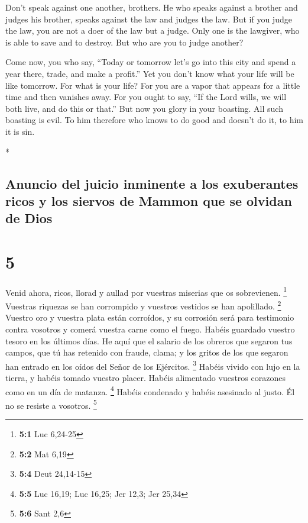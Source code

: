 \begin{paracol}{2}
\begin{otherlanguage}{english}
 Don't speak against one another, brothers. He who speaks
against a brother and judges his brother, speaks against the law and
judges the law. But if you judge the law, you are not a doer of the law
but a judge.  Only one is the lawgiver, who is able to
save and to destroy. But who are you to judge another?

 Come now, you who say, ``Today or tomorrow let's go into
this city and spend a year there, trade, and make a profit.''
 Yet you don't know what your life will be like tomorrow.
For what is your life? For you are a vapor that appears for a little
time and then vanishes away.  For you ought to say, ``If
the Lord wills, we will both live, and do this or that.''
 But now you glory in your boasting. All such boasting is
evil.  To him therefore who knows to do good and doesn't
do it, to him it is sin.

\end{otherlanguage}

\switchcolumn[0]*

\hypertarget{anuncio-del-juicio-inminente-a-los-exuberantes-ricos-y-los-siervos-de-mammon-que-se-olvidan-de-dios}{%
\subsection{Anuncio del juicio inminente a los exuberantes ricos y los
siervos de Mammon que se olvidan de
Dios}\label{anuncio-del-juicio-inminente-a-los-exuberantes-ricos-y-los-siervos-de-mammon-que-se-olvidan-de-dios}}

\hypertarget{section-8}{%
\section{5}\label{section-8}}

 Venid ahora, ricos, llorad y aullad por vuestras miserias
que os sobrevienen. \footnote{\textbf{5:1} Luc 6,24-25} 
Vuestras riquezas se han corrompido y vuestros vestidos se han
apolillado. \footnote{\textbf{5:2} Mat 6,19}  Vuestro oro
y vuestra plata están corroídos, y su corrosión será para testimonio
contra vosotros y comerá vuestra carne como el fuego. Habéis guardado
vuestro tesoro en los últimos días.  He aquí que el
salario de los obreros que segaron tus campos, que tú has retenido con
fraude, clama; y los gritos de los que segaron han entrado en los oídos
del Señor de los Ejércitos. \footnote{\textbf{5:4} Deut 24,14-15}
 Habéis vivido con lujo en la tierra, y habéis tomado
vuestro placer. Habéis alimentado vuestros corazones como en un día de
matanza. \footnote{\textbf{5:5} Luc 16,19; Luc 16,25; Jer 12,3; Jer
  25,34}  Habéis condenado y habéis asesinado al justo. Él
no se resiste a vosotros. \footnote{\textbf{5:6} Sant 2,6}


\end{paracol}
